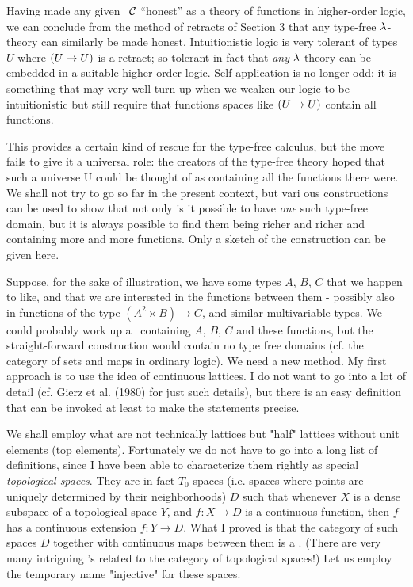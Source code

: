 Having made any given \ccc\ $\mathcal C$ ``honest'' as a theory of func­tions in higher-order logic, we can conclude from the method of retracts of Section 3 that any type-free $\lambda$-theory can similarly be made honest. Intuitionistic logic is very tolerant of types $U$ where $(U\rightarrow U)$ is a retract; so tolerant in fact that {\it any} $\lambda$ theory can be embedded in a suitable higher-order logic. Self­ application is no longer odd: it is something that may very well turn up when we weaken our logic to be intuitionistic but still require that functions spaces like $(U\rightarrow U)$ contain all functions.

This provides a certain kind of rescue for the type-free calculus, but the move fails to give it a universal role: the creators of the type-free theory hoped that such a universe U could be thought of as containing all the functions there were. We shall not try to go so far in the present context, but vari­ ous constructions can be used to show that not only is it pos­sible to have {\it one} such type-free domain, but it is always pos­sible to find them being richer and richer and containing more and more functions. Only a sketch of the construction can be given here.

Suppose, for the sake of illustration, we have some types $A$, $B$, $C$ that we happen to like, and that we are interested in the
functions between them - possibly also in functions of the type $(A^2 \times B) \to C$, and similar multivariable types. We could probably work up a \ccc\  containing $A$, $B$, $C$ and these functions, but the straight-forward construction would contain no type­ free domains (cf. the category of sets and maps in ordinary logic). We need a new method. My first approach is to use the idea of continuous lattices. I do not want to go into a lot of detail (cf. Gierz et al. (1980) for just such details), but there is an easy definition that can be invoked at least to make the statements precise.

We shall employ what are not technically lattices but "half" lattices without unit elements (top elements). Fortunately we do not have to go into a long list of definitions, since I have been able to characterize them rightly as special {\it topological spaces}. They are in fact $T_0$-spaces (i.e. spaces where points are uniquely determined by their neighborhoods) $D$ such that whenever $X$ is a dense subspace of a topological space $Y$, and $f : X\to D$ is a continuous function, then $f$ has a continuous ex­tension $f:Y\to D$. What I proved is that the category of such spaces $D$ together with continuous maps between them is a \ccc . (There are very many intriguing \ccc's related to the cate­gory of topological spaces!) Let us employ the temporary name "injective" for these spaces.

